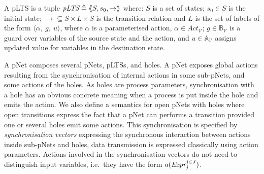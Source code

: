 \documentclass{llncs}
\newcommand{\Simon}{\\\hfill\mdash Simon}
\newcommand{\noteSB}[2][color=green!40, size=\tiny]{\todo[#1]{{#2}\Simon}}
\newcommand{\Ludo}{\\\hfill\mdash Ludo}
\newcommand{\noteLH}[2][color=orange!40, size=\tiny]{\todo[#1]{{#2}\Ludo}}
\newcommand{\newCoord}[1]{{\color{blue}#1}}
\newcommand{\sA}{\ensuremath{\mathbb{A}}}
\newcommand{\sB}{\ensuremath{\mathbb{B}}}
\newcommand{\cV}{\ensuremath{\mathcal{V}}}
\newcommand{\mdash}[1][]{---#1}
\newcommand{\ie}[1][\ ]{i.e.#1}
\newcommand{\variables}{\ensuremath{\cV}}
\newcommand{\actions}[1]{\ensuremath{\mathit{Act}_{#1}}}
\newcommand{\boolexprs}[1]{\ensuremath{\sB_{#1}}}
\newcommand{\assigns}[1]{\ensuremath{\sA_{#1}}}
\begin{document}
\begin{definition}[pLTS]
\label{pLTS}
A pLTS is a tuple
$\pLTS\triangleq\mylangle S,s_0, \to\myrangle$ where:
$S$ is a set of states; %
$s_0 \in S$ is the initial state;
${\to} \subseteq S \times L \times S$ is the transition relation and 
$L$ is the set of labels of the form
$\langle \alpha,~g,~u\rangle$,
where $\alpha$ is a parameterised action, $\alpha \in\actions{\variables}$; 
$g\in\boolexprs{\variables}$ is a guard over variables of the source state and the 
action, and $u\in\assigns{\variables}$
assigns updated value for variables in the destination state. 
\end{definition}
A pNet composes several pNets, pLTSs, and holes.
A  pNet  exposes
 global actions resulting from the synchronisation of internal actions in some sub-pNets, and some actions of the holes. \newCoord{As holes are process parameters, synchronisation with a hole has an obvious concrete meaning when a process is put inside the hole and emits the action. We  also define a semantics for open pNets with holes where open transitions express the fact that a pNet can performs a transition provided one or several holes emit some actions.}
\newCoord{This synchronisation  is specified by  \emph{synchronisation vectors} expressing the synchronous interaction between actions inside sub-pNets and holes, data transmission is expressed classically using action parameters.}
Actions involved in the synchronisation vectors do
not need to distinguish input variables, \ie they 
have the form $a(\Expr_j^{j \in J})$.
\end{document}
